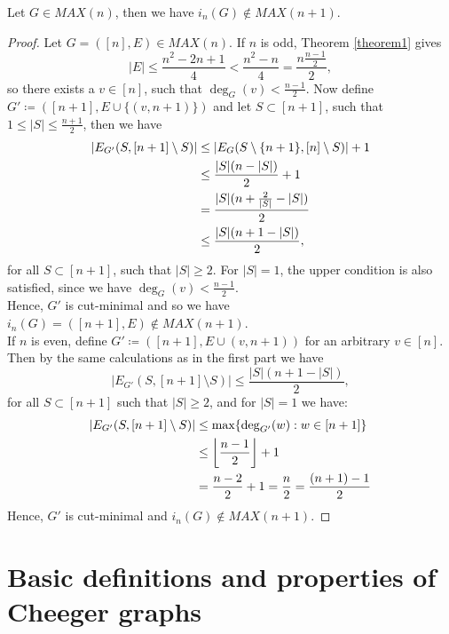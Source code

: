 \begin{prop}
Let \(G\in MAX(n)\), then we have \(i_n(G)\notin MAX(n+1)\).
\begin{proof}
Let \(G=([n],E)\in MAX(n)\). If \(n\) is odd, Theorem \ref{theorem1} gives
\[
|E|\leq\frac{n^2-2n+1}{4}<\frac{n^2-n}{4}=\frac{n\frac{n-1}{2}}{2},
\]
so there exists a \(v\in [n]\), such that \(\deg_G(v)<\frac{n-1}{2}\). Now define\\
\(G'\coloneqq ([n+1],E\cup\{(v,n+1)\})\) and let \(S\subset [n+1]\), such that \(1\leq |S|\leq\frac{n+1}{2}\), then we have
\begin{align}
|E_{G'}(S,[n+1]\setminus S)|&\leq |E_G(S\setminus\{n+1\},[n]\setminus S)|+1\notag\\
&\leq\frac{|S|(n-|S|)}{2}+1\notag\\
&=\frac{|S|(n+\frac{2}{|S|}-|S|)}{2}\notag\\
&\leq\frac{|S|(n+1-|S|)}{2},\notag
\end{align}
for all \(S\subset [n+1]\), such that \(|S|\geq 2\). For \(|S|=1\), the upper condition is also satisfied, since we have \(\deg_G(v)<\frac{n-1}{2}\).\\
Hence, \(G'\) is cut-minimal and so we have \(i_n(G)=([n+1],E)\notin MAX(n+1)\).\\
If \(n\) is even, define \(G'\coloneqq ([n+1],E\cup (v,n+1))\) for an arbitrary \(v\in [n]\). Then by the same calculations as in the first part we have
\[
|E_{G'}(S,[n+1]\setminus S)|\leq\frac{|S|(n+1-|S|)}{2},
\]
for all \(S\subset [n+1]\) such that \(|S|\geq 2\), and for \(|S|=1\) we have:
\begin{align}
|E_{G'}(S,[n+1]\setminus S)|&\leq\text{max}\{\deg_{G'}(w):w\in[n+1]\}\notag\\
&\leq\left\lfloor\frac{n-1}{2}\right\rfloor +1\notag\\
&=\frac{n-2}{2}+1=\frac{n}{2}=\frac{(n+1)-1}{2}\notag
\end{align}
Hence, \(G'\) is cut-minimal and \(i_n(G)\notin MAX(n+1)\).
\end{proof}
\end{prop}

\section{Basic definitions and properties of Cheeger graphs}

